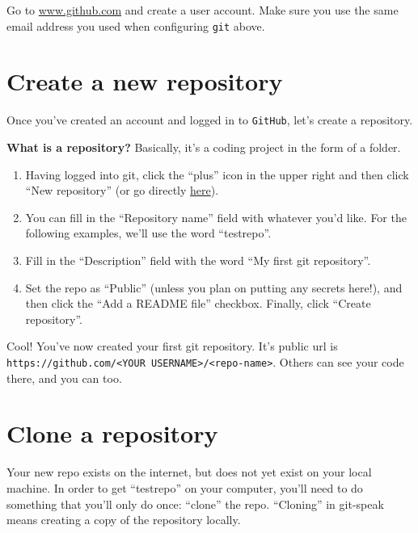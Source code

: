 \documentclass[
]{book}
\begin{document}
Go to \url{www.github.com} and create a user account. Make sure you use the same email address you used when configuring \texttt{git} above.

\hypertarget{create-a-new-repository}{%
\section*{Create a new repository}\label{create-a-new-repository}}

Once you've created an account and logged in to \texttt{GitHub}, let's create a repository.

\textbf{What is a repository?} Basically, it's a coding project in the form of a folder.

\begin{enumerate}
\def\labelenumi{\arabic{enumi}.}
\item
  Having logged into git, click the ``plus'' icon in the upper right and then click ``New repository'' (or go directly \href{https://github.com/new}{here}).
\item
  You can fill in the ``Repository name'' field with whatever you'd like. For the following examples, we'll use the word ``testrepo''.
\item
  Fill in the ``Description'' field with the word ``My first git repository''.
\item
  Set the repo as ``Public'' (unless you plan on putting any secrets here!), and then click the ``Add a README file'' checkbox. Finally, click ``Create repository''.
\end{enumerate}

Cool! You've now created your first git repository. It's public url is \texttt{https://github.com/\textless{}YOUR\ USERNAME\textgreater{}/\textless{}repo-name\textgreater{}}. Others can see your code there, and you can too.

\hypertarget{clone-a-repository}{%
\section*{Clone a repository}\label{clone-a-repository}}

Your new repo exists on the internet, but does not yet exist on your local machine. In order to get ``testrepo'' on your computer, you'll need to do something that you'll only do once: ``clone'' the repo. ``Cloning'' in git-speak means creating a copy of the repository locally.
\end{document}
